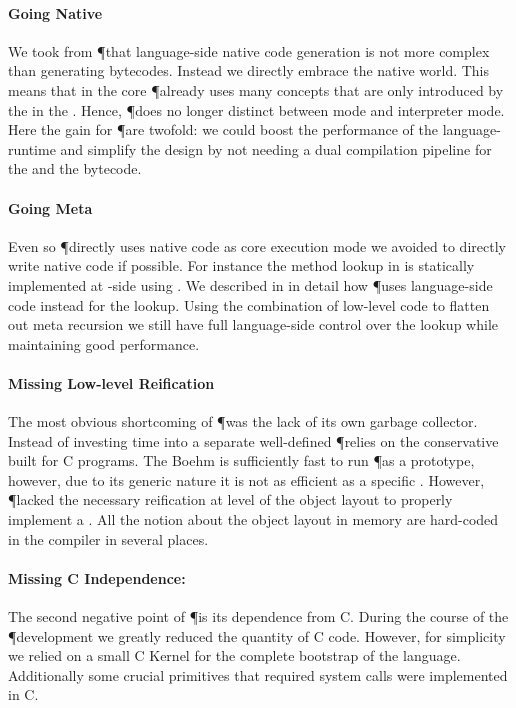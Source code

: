 \paragraph{Going Native}
We took from \P that language-side native code generation is not more complex than generating bytecodes.
Instead we directly embrace the native world.
This means that in the core \P already uses many concepts that are only introduced by the \JIT in the \Cog \VM.
Hence, \P does no longer distinct between \JIT mode and interpreter mode.
Here the gain for \P are twofold: we could boost the performance of the language-runtime and simplify the design by not needing a dual compilation pipeline for the \JIT and the bytecode.

\paragraph{Going Meta}
Even so \P directly uses native code as core execution mode we avoided to directly write native code if possible.
For instance the method lookup in \Cog is statically implemented at \VM-side using \Slang.
We described in  in detail how \P uses language-side code instead for the lookup.
Using the combination of low-level code to flatten out meta recursion we still have full language-side control over the lookup while maintaining good performance.

\paragraph{Missing Low-level Reification}
The most obvious shortcoming of \P was the lack of its own garbage collector.
Instead of investing time into a separate well-defined \GC \P relies on the conservative  built for C programs.
The Boehm \GC is sufficiently fast to run \P as a prototype, however, due to its generic nature it is not as efficient as a specific \GC.
However, \P lacked the necessary reification at level of the object layout to properly implement a \GC.
All the notion about the object layout in memory are hard-coded in the compiler in several places.

\paragraph{Missing C Independence:}
The second negative point of \P is its dependence from C.
During the course of the \P development we greatly reduced the quantity of C code.
However, for simplicity we relied on a small C Kernel for the complete bootstrap of the language.
Additionally some crucial primitives that required system calls were implemented in C.


